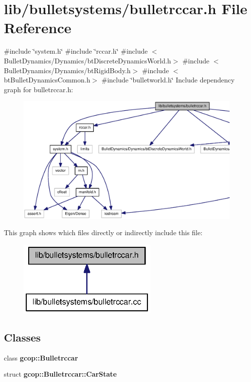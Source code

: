 \section{lib/bulletsystems/bulletrccar.h \-File \-Reference}
\label{bulletrccar_8h}
{\ttfamily \#include \char`\"{}system.\-h\char`\"{}}\*
{\ttfamily \#include \char`\"{}rccar.\-h\char`\"{}}\*
{\ttfamily \#include $<$\-Bullet\-Dynamics/\-Dynamics/bt\-Discrete\-Dynamics\-World.\-h$>$}\*
{\ttfamily \#include $<$\-Bullet\-Dynamics/\-Dynamics/bt\-Rigid\-Body.\-h$>$}\*
{\ttfamily \#include $<$bt\-Bullet\-Dynamics\-Common.\-h$>$}\*
{\ttfamily \#include \char`\"{}bulletworld.\-h\char`\"{}}\*
\-Include dependency graph for bulletrccar.\-h\-:\nopagebreak
\begin{figure}[H]
\begin{center}
\leavevmode
\includegraphics[width=350pt]{bulletrccar_8h__incl}
\end{center}
\end{figure}
\-This graph shows which files directly or indirectly include this file\-:\nopagebreak
\begin{figure}[H]
\begin{center}
\leavevmode
\includegraphics[width=196pt]{bulletrccar_8h__dep__incl}
\end{center}
\end{figure}
\subsection*{\-Classes}
\begin{DoxyCompactItemize}
\item 
class {\bf gcop\-::\-Bulletrccar}
\item 
struct {\bf gcop\-::\-Bulletrccar\-::\-Car\-State}
\end{DoxyCompactItemize}
